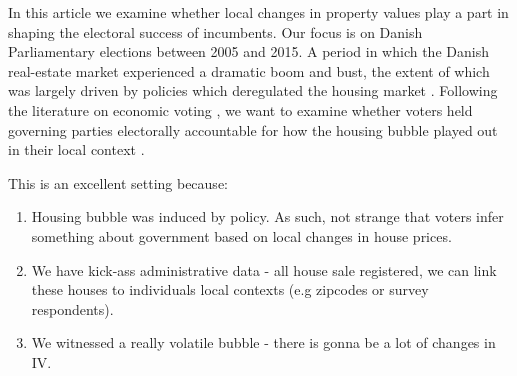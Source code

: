 \documentclass[12pt,a4paper]{article}
\begin{document}
In this article we examine whether local changes in property values play a part in shaping the electoral success of incumbents. Our focus is on Danish Parliamentary elections between 2005 and 2015. A period in which the Danish real-estate market  experienced a dramatic boom and bust, the extent of which was largely driven by policies which deregulated the housing market \citep{dam2011housing}. Following the literature on economic voting \citep{healy2013retrospective,lewis2013vp}, we want to examine whether voters held governing parties electorally accountable for how the housing bubble played out in their local context . 

This is an excellent setting because: 

\begin{enumerate}
	\item Housing bubble was induced by policy. As such, not strange that voters infer something about government based on local changes in house prices.
	\item We have kick-ass administrative data - all house sale registered, we can link these houses to individuals local contexts (e.g zipcodes or survey respondents).
	\item We witnessed a really volatile bubble - there is gonna be a lot of changes in IV.
\end{enumerate}






\end{document}
